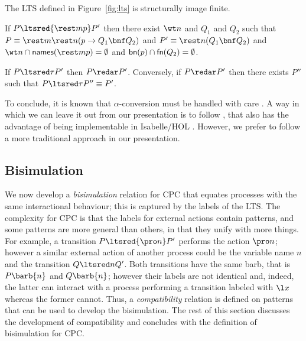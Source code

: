 \documentclass{LMCS}
\begin{document}
\begin{prop}
\label{prop:imfin}
The LTS defined in Figure~\ref{fig:lts} is structurally image finite.
\end{prop}


\begin{lem}
\label{lem:lts-exhibit-p}
If $P\ltsred{\rest m p}P'$ then 
there exist $\wt n$ and $Q_1$ and $Q_2$ such that 
$P \equiv \rest m \rest n (p\to Q_1\bnf Q_2)$ and
$P' \equiv \rest n (Q_1\bnf Q_2)$ and
$\wt n\cap{\sf names}(\rest m p)=\emptyset$ and ${\sf bn}(p)\cap{\sf fn}(Q_2)=\emptyset$.
\end{lem}

\begin{prop}
\label{prop:tau-red}
If $P \ltsred\tau P'$ then $P \redar P'$.
Conversely, if $P \redar P'$ then there exists $P''$ such that $P \ltsred\tau P'' \equiv P'$.
\end{prop}

To conclude, it is known that $\alpha$-conversion must be handled with care \cite{UBN07}.
A way in which we can leave it out from our presentation is to follow \cite{BP09}, that
also has the advantage of being implementable in Isabelle/HOL \cite{NPW02}.
However, we prefer to follow a more traditional approach in our presentation.


\subsection{Bisimulation}
\label{sec:bis}

We now develop a {\em bisimulation} relation for CPC that equates processes with the same interactional behaviour; this is captured by the labels of the LTS.
The complexity for CPC is that the labels for external actions contain patterns, and some patterns are more general than others, in that they unify with more things. 
For example, a transition $P\ltsred{\pro n}P'$ performs the action $\pro n$; however a similar external action of another process could be the variable name $n$ and the transition $Q\ltsred n Q'$.
Both transitions have the same barb, that is $P\barb{n}$ and $Q\barb{n}$; however their labels are not identical
and, indeed, the latter can interact with a process performing a transition labeled with $\l x$ whereas the former cannot.
Thus, a {\em compatibility} relation is defined on patterns that can be used to develop the bisimulation.
The rest of this section discusses the development of compatibility and concludes with the definition of bisimulation for CPC.
\end{document}
